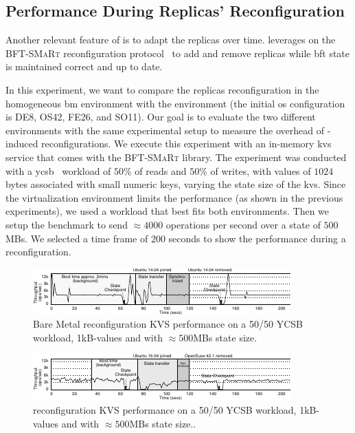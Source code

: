 \subsection{Performance During Replicas' Reconfiguration}
\label{sec:reconfiguration}
Another relevant feature of \system is to adapt the replicas over time. 
\system leverages on the \textsc{BFT-SMaRt} reconfiguration protocol~\cite{Bessani:2014} to add and remove replicas while \gls{bft} state is maintained correct and up to date.

In this experiment, we want to compare the replicas reconfiguration in the homogeneous \gls{bm} environment with the \system environment (the initial \gls{os} configuration is DE8, OS42, FE26, and SO11).
Our goal is to evaluate the two different environments with the same experimental setup to measure the overhead of \system-induced reconfigurations. 
We execute this experiment with an in-memory \gls{kvs} service that comes with the \textsc{BFT-SMaRt} library.
The experiment was conducted with a \gls{ycsb}~\cite{Cooper:2010} workload of $50\%$ of reads and $50\%$ of writes, with values of $1024$ bytes associated with small numeric keys, varying the state size of the \gls{kvs}.
Since the virtualization environment limits the performance (as shown in the previous experiments), we used a workload that best fits both environments.
Then we setup the benchmark to send $\approx 4000$ operations per second over a state of $500$MBs. 
We selected a time frame of $200$ seconds to show the performance during a reconfiguration.


\begin{figure}[t]
\begin{center}
\includegraphics[width=\textwidth]{images/gnuplot/vagrant/reconfiguration/reconfiguration_bm.pdf}
\caption{Bare Metal reconfiguration KVS performance on a 50/50 YCSB workload, 1kB-values and with $\approx 500$MBs state size.}
\label{fig:reconfiguration_bm}
\end{center}
\end{figure}
\begin{figure}[t]
\begin{center}
\includegraphics[width=\textwidth]{images/gnuplot/vagrant/reconfiguration/reconfiguration_vm.pdf}
\caption{\system reconfiguration KVS performance on a 50/50 YCSB workload, 1kB-values and with $\approx 500$MBs state size..}
\label{fig:reconfiguration_vm}
\end{center}
\end{figure}

